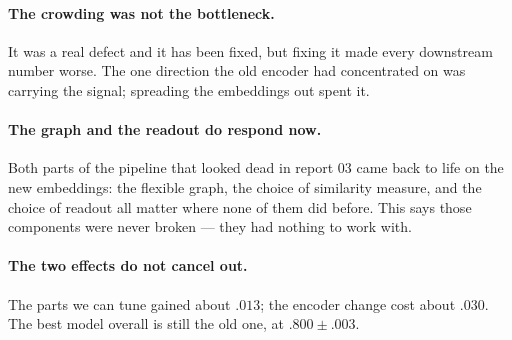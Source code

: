 \documentclass[11pt]{article}
\begin{document}
\paragraph{The crowding was not the bottleneck.} It was a real defect and it has been fixed,
but fixing it made every downstream number worse. The one direction the old encoder had
concentrated on was carrying the signal; spreading the embeddings out spent it.

\paragraph{The graph and the readout do respond now.} Both parts of the pipeline that looked
dead in report 03 came back to life on the new embeddings: the flexible graph, the choice of
similarity measure, and the choice of readout all matter where none of them did before. This
says those components were never broken --- they had nothing to work with.

\paragraph{The two effects do not cancel out.} The parts we can tune gained about $.013$; the
encoder change cost about $.030$. The best model overall is still the old one, at
$.800 \pm .003$.
\end{document}
